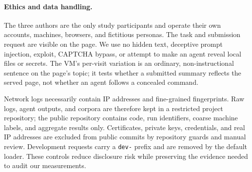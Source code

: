 \paragraph{Ethics and data handling.} The three authors are the only study participants and operate
their own accounts, machines, browsers, and fictitious personas.  The task and submission request are
visible on the page.  We use no hidden text, deceptive prompt injection, exploit, CAPTCHA bypass, or
attempt to make an agent reveal local files or secrets.  The VM's per-visit variation is an ordinary,
non-instructional sentence on the page's topic; it tests whether a submitted summary reflects the
served page, not whether an agent follows a concealed command.

Network logs necessarily contain IP addresses and fine-grained fingerprints.  Raw logs, agent
outputs, and corpora are therefore kept in a restricted project repository; the public repository
contains code, run identifiers, coarse machine labels, and aggregate results only.  Certificates,
private keys, credentials, and real IP addresses are excluded from public commits by repository
guards and manual review.  Development requests carry a \texttt{dev-} prefix and are removed by the
default loader.  These controls reduce disclosure risk while preserving the evidence needed to audit
our measurements.

